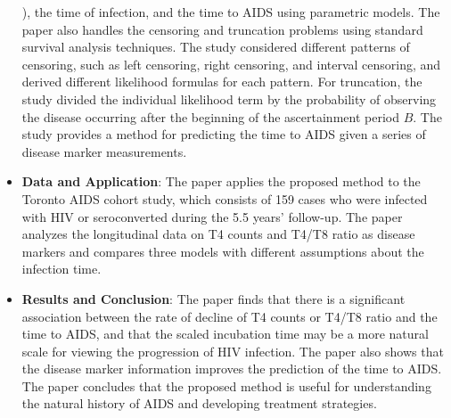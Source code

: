 \documentclass[UTF8,a4paper,10pt]{article}
\begin{document}
\begin{itemize}
  ), the time of infection, and the time to AIDS using parametric models. The paper also handles the censoring and truncation problems using standard survival analysis techniques. The study considered different patterns of censoring, such as left censoring, right censoring, and interval censoring, and derived different likelihood formulas for each pattern. For truncation, the study divided the individual likelihood term by the probability of observing the disease occurring after the beginning of the ascertainment period \(B\). The study provides a method for predicting the time to AIDS given a series of disease marker measurements.
  \item \textbf{Data and Application}: The paper applies the proposed method to the Toronto AIDS cohort study, which consists of 159 cases who were infected with HIV or seroconverted during the 5.5 years' follow-up. The paper analyzes the longitudinal data on T4 counts and T4/T8 ratio as disease markers and compares three models with different assumptions about the infection time.
  \item \textbf{Results and Conclusion}: The paper finds that there is a significant association between the rate of decline of T4 counts or T4/T8 ratio and the time to AIDS, and that the scaled incubation time may be a more natural scale for viewing the progression of HIV infection. The paper also shows that the disease marker information improves the prediction of the time to AIDS. The paper concludes that the proposed method is useful for understanding the natural history of AIDS and developing treatment strategies.
\end{itemize}








\begin{equation*}
  \begin{aligned}
  \end{aligned}
\end{equation*}
\end{document}

